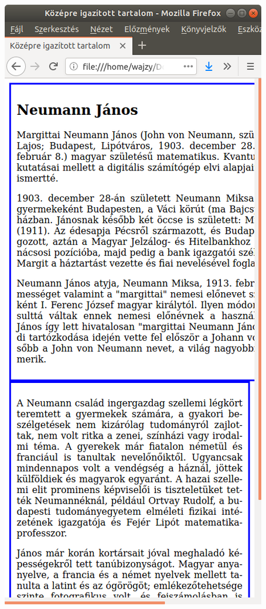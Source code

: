 \begin{frame}
\begin{columns}[c]
      \includegraphics[width=\textwidth]{kozepre2.png}
  \end{columns}
\end{frame}

